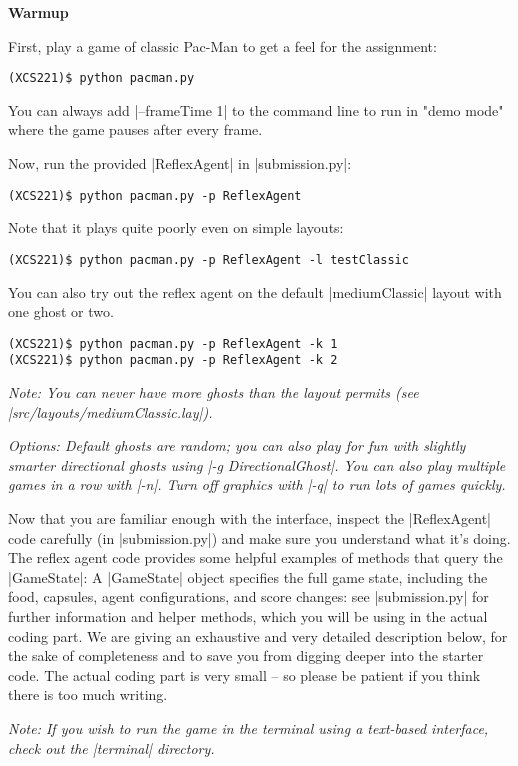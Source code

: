 {\bf Warmup}

First, play a game of classic Pac-Man to get a feel for the assignment:

\begin{lstlisting}
(XCS221)$ python pacman.py
\end{lstlisting}

You can always add |--frameTime 1| to the command line to run in "demo mode"
where the game pauses after every frame.

Now, run the provided |ReflexAgent| in |submission.py|:

\begin{lstlisting}
(XCS221)$ python pacman.py -p ReflexAgent
\end{lstlisting}

Note that it plays quite poorly even on simple layouts:

\begin{lstlisting}
(XCS221)$ python pacman.py -p ReflexAgent -l testClassic
\end{lstlisting}

You can also try out the reflex agent on the default |mediumClassic| layout with
one ghost or two.

\begin{lstlisting}
(XCS221)$ python pacman.py -p ReflexAgent -k 1
(XCS221)$ python pacman.py -p ReflexAgent -k 2
\end{lstlisting}

{\em Note: You can never have more ghosts than the layout permits (see
|src/layouts/mediumClassic.lay|).}

{\em Options: Default ghosts are random; you can also play for fun with slightly
smarter directional ghosts using |-g DirectionalGhost|. You can also play
multiple games in a row with |-n|. Turn off graphics with |-q| to run lots of
games quickly.}

Now that you are familiar enough with the interface, inspect the |ReflexAgent|
code carefully (in |submission.py|) and make sure you understand what it's
doing. The reflex agent code provides some helpful examples of methods that
query the |GameState|: A |GameState| object specifies the full game state,
including the food, capsules, agent configurations, and score changes: see
|submission.py| for further information and helper methods, which you will be
using in the actual coding part. We are giving an exhaustive and very detailed
description below, for the sake of completeness and to save you from digging
deeper into the starter code. The actual coding part is very small -- so please
be patient if you think there is too much writing.

{\em Note: If you wish to run the game in the terminal using a text-based
interface, check out the |terminal| directory.}
